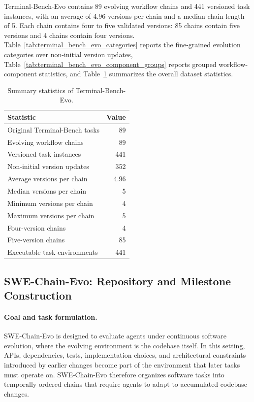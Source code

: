 \documentclass{llmxive}
\begin{document}
Terminal-Bench-Evo contains 89 evolving workflow chains and 441 versioned task instances, with an average of 4.96 versions per chain and a median chain length of 5. Each chain contains four to five validated versions: 85 chains contain five versions and 4 chains contain four versions. Table~\ref{tab:terminal_bench_evo_categories} reports the fine-grained evolution categories over non-initial version updates, Table~\ref{tab:terminal_bench_evo_component_groups} reports grouped workflow-component statistics, and Table~\ref{tab:terminal_bench_evo_statistics} summarizes the overall dataset statistics.


\begin{table}[t]
\centering
\small
\begin{tabular}{lr}
\toprule
\textbf{Statistic} & \textbf{Value} \\
\midrule
Original Terminal-Bench tasks & 89 \\
Evolving workflow chains & 89 \\
Versioned task instances & 441 \\
Non-initial version updates & 352 \\
Average versions per chain & 4.96 \\
Median versions per chain & 5 \\
Minimum versions per chain & 4 \\
Maximum versions per chain & 5 \\
Four-version chains & 4 \\
Five-version chains & 85 \\
Executable task environments & 441 \\
\bottomrule
\end{tabular}
\caption{Summary statistics of Terminal-Bench-Evo.}
\label{tab:terminal_bench_evo_statistics}
\end{table}








\subsection{SWE-Chain-Evo: Repository and Milestone Construction}
\label{app:swe}
\label{app:swe_milestone}

\paragraph{Goal and task formulation.}
SWE-Chain-Evo is designed to evaluate agents under continuous software evolution, where the evolving environment is the codebase itself. In this setting, APIs, dependencies, tests, implementation choices, and architectural constraints introduced by earlier changes become part of the environment that later tasks must operate on. SWE-Chain-Evo therefore organizes software tasks into temporally ordered chains that require agents to adapt to accumulated codebase changes.
\end{document}
